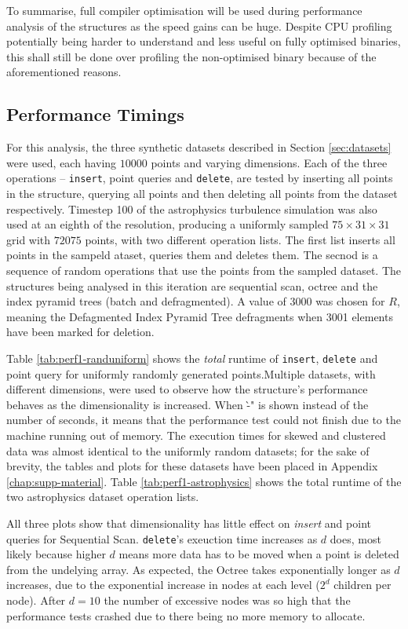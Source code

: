 To summarise, full compiler optimisation will be used during performance analysis of the structures as the speed gains can be huge. Despite CPU profiling potentially being harder to understand and less useful on fully optimised binaries, this shall still be done over profiling the non-optimised binary because of the aforementioned reasons.

\subsection{Performance Timings}

For this analysis, the three synthetic datasets described in Section \ref{sec:datasets} were used, each having $10000$ points and varying dimensions. Each of the three operations -- \texttt{insert}, point queries and \texttt{delete}, are tested by inserting all points in the structure, querying all points and then deleting all points from the dataset respectively. Timestep 100 of the astrophysics turbulence simulation was also used at an eighth of the resolution, producing a uniformly sampled $75 \times 31 \times 31$ grid with $72075$ points, with two different operation lists. The first list inserts all points in the sampeld ataset, queries them and deletes them. The secnod is a sequence of random operations that use the points from the sampled dataset. The structures being analysed in this iteration are sequential scan, octree and the index pyramid trees (batch and defragmented). A value of 3000 was chosen for $R$, meaning the Defagmented Index Pyramid Tree defragments when 3001 elements have been marked for deletion.

Table \ref{tab:perf1-randuniform} shows the \textit{total} runtime of \texttt{insert}, \texttt{delete} and point query for uniformly randomly generated points.Multiple datasets, with different dimensions, were used to observe how the structure's performance behaves as the dimensionality is increased.  When \`-" is shown instead of the number of seconds, it means that the performance test could not finish due to the machine running out of memory. The execution times for skewed and clustered data was almost identical to the uniformly random datasets; for the sake of brevity, the tables and plots for these datasets have been placed in Appendix \ref{chap:supp-material}. Table \ref{tab:perf1-astrophysics} shows the total runtime of the two astrophysics dataset operation lists.

All three plots show that dimensionality has little effect on \textit{insert} and point queries for Sequential Scan. \texttt{delete}'s exeuction time increases as $d$ does, most likely because higher $d$ means more data has to be moved when a point is deleted from the undelying array. As expected, the Octree takes exponentially longer as $d$ increases, due to the exponential increase in nodes at each level ($2^d$ children per node). After $d = 10$ the number of excessive nodes was so high that the performance tests crashed due to there being no more memory to allocate.

